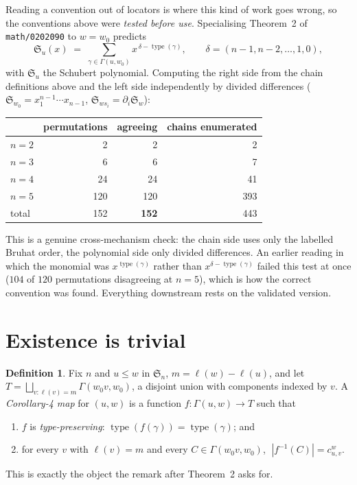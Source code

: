 \documentclass[11pt]{article}
\theoremstyle{plain}
\theoremstyle{definition}
\newtheorem{definition}[theorem]{Definition}
\newcommand{\Gam}{\Gamma}
\newcommand{\wo}{w_0}
\newcommand{\Sn}{\mathfrak{S}_n}
\DeclareMathOperator{\type}{type}
\begin{document}
Reading a convention out of locators is where this kind of work goes wrong, so
the conventions above were \emph{tested before use}.  Specialising Theorem~2 of
\texttt{math/0202090} to $w=\wo$ predicts
\begin{equation}\label{eq:thm2}
  \mathfrak{S}_u(x)\;=\;\sum_{\gamma\in\Gam(u,\wo)} x^{\,\delta-\type(\gamma)},
  \qquad \delta=(n-1,n-2,\dots,1,0),
\end{equation}
with $\mathfrak{S}_u$ the Schubert polynomial.  Computing the right side from the
chain definitions above and the left side independently by divided differences
($\mathfrak{S}_{\wo}=x_1^{n-1}\cdots x_{n-1}$, $\mathfrak{S}_{ws_i}=\partial_i\mathfrak{S}_w$):

\begin{center}
\begin{tabular}{lrrr}
\toprule
 & permutations & agreeing & chains enumerated\\
\midrule
$n=2$ & 2 & 2 & 2\\
$n=3$ & 6 & 6 & 7\\
$n=4$ & 24 & 24 & 41\\
$n=5$ & 120 & 120 & 393\\
\midrule
total & 152 & \textbf{152} & 443\\
\bottomrule
\end{tabular}
\end{center}

\noindent
This is a genuine cross-mechanism check: the chain side uses only the labelled
Bruhat order, the polynomial side only divided differences.  An earlier reading
in which the monomial was $x^{\type(\gamma)}$ rather than $x^{\delta-\type(\gamma)}$
failed this test at once ($104$ of $120$ permutations disagreeing at $n=5$),
which is how the correct convention was found.  Everything downstream rests on
the validated version.

\section{Existence is trivial}

\begin{definition}\label{def:cor4map}
Fix $n$ and $u\le w$ in $\Sn$, $m=\ell(w)-\ell(u)$, and let
$T=\bigsqcup_{v:\ell(v)=m}\Gam(\wo v,\wo)$, a disjoint union with components
indexed by $v$.  A \emph{Corollary-4 map} for $(u,w)$ is a function
$f:\Gam(u,w)\to T$ such that
\begin{enumerate}
\item[(i)] $f$ is \emph{type-preserving}: $\type(f(\gamma))=\type(\gamma)$; and
\item[(ii)] for every $v$ with $\ell(v)=m$ and every $C\in\Gam(\wo v,\wo)$,
  $\;|f^{-1}(C)|=c^w_{u,v}$.
\end{enumerate}
This is exactly the object the remark after Theorem~2 asks for.
\end{definition}
\end{document}
